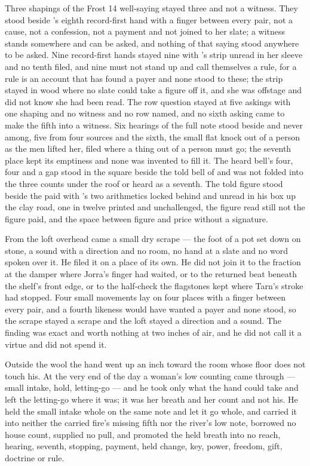 Three shapings of the Frost 14 well-saying stayed three and not a witness. They stood beside 's eighth record-first hand with a finger between every pair, not a cause, not a confession, not a payment and not joined to her slate; a witness stands somewhere and can be asked, and nothing of that saying stood anywhere to be asked. Nine record-first hands stayed nine with 's strip unread in her sleeve and no tenth filed, and nine must not stand up and call themselves a rule, for a rule is an account that has found a payer and none stood to these; the strip stayed in wood where no slate could take a figure off it, and she was offstage and did not know she had been read. The row question stayed at five askings with one shaping and no witness and no row named, and no sixth asking came to make the fifth into a witness. Six hearings of the full note stood beside and never among, five from four sources and the sixth, the small flat knock out of a person as the men lifted her, filed where a thing out of a person must go; the seventh place kept its emptiness and none was invented to fill it. The heard bell's four, four and a gap stood in the square beside the told bell of  and was not folded into the three counts under the roof or heard as a seventh. The told figure stood beside the paid with 's two arithmetics locked behind and unread in his box up the clay road, one in twelve printed and unchallenged, the figure read still not the figure paid, and the space between figure and price without a signature.

From the loft overhead came a small dry scrape --- the foot of a pot set down on stone, a sound with a direction and no room, no hand at a slate and no word spoken over it. He filed it on a place of its own. He did not join it to the fraction at the damper where Jorra's finger had waited, or to the returned beat beneath the shelf's front edge, or to the half-check the flagstones kept where Tarn's stroke had stopped. Four small movements lay on four places with a finger between every pair, and a fourth likeness would have wanted a payer and none stood, so the scrape stayed a scrape and the loft stayed a direction and a sound. The finding was exact and worth nothing at two inches of air, and he did not call it a virtue and did not spend it.

Outside the wool the hand went up an inch toward the room whose floor does not touch his. At the very end of the day a woman's low counting came through --- small intake, hold, letting-go --- and he took only what the hand could take and left the letting-go where it was; it was her breath and her count and not his. He held the small intake whole on the same note and let it go whole, and carried it into neither the carried fire's missing fifth nor the river's low note, borrowed no house count, supplied no pull, and promoted the held breath into no reach, hearing, seventh, stopping, payment, held change, key, power, freedom, gift, doctrine or rule.

